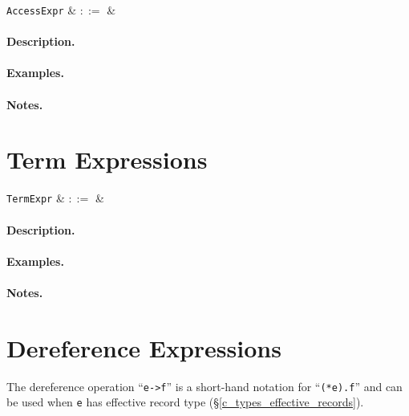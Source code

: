\begin{syntax}
  \verb+AccessExpr+ & $::=$ &\\
\end{syntax}

\paragraph{Description.}

\paragraph{Examples.}

\paragraph{Notes.} 


\section{Term Expressions}
\label{c_expr_term}

\begin{syntax}
  \verb+TermExpr+ & $::=$ &\\
\end{syntax}

\paragraph{Description.}

\paragraph{Examples.}

\paragraph{Notes.} 


\section{Dereference Expressions}
\label{c_expr_dereference}


 The dereference operation ``\lstinline{e->f}'' is a short-hand notation for ``\lstinline{(*e).f}'' and can be used when \lstinline{e} has effective record type (\S\ref{c_types_effective_records}).

